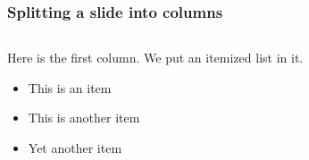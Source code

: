 \documentclass{beamer}
\subtitle{Das Corporate Design in  LaTeX}
\author{Martin Bäker\and Enrico Jörns}
\begin{document}



\begin{frame}[plain]
  \titlepage
\end{frame}


\begin{frame}
\frametitle{Splitting a slide into columns}
\begin{columns}
  \begin{column}{0.5\textwidth}
    Here is the first column.  We put an itemized list in it.
    \begin{itemize}
      \item This is an item
      \item This is another item
      \item Yet another item
    \end{itemize}
  \end{column}
\end{columns}
\end{frame}
\end{document}
